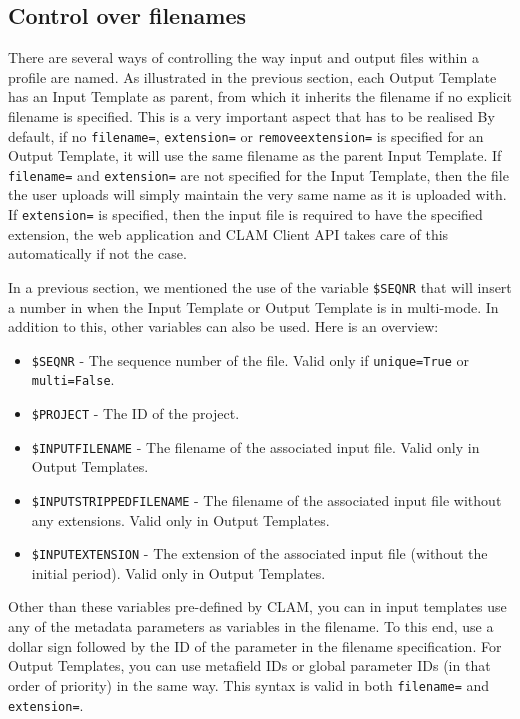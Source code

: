 \documentclass[a4paper,12pt]{report}
\begin{document}
\subsection{Control over filenames}
\label{sec:filenamevariables}

There are several ways of controlling the way input and output files within a
profile are named. As illustrated in the previous section, each Output Template
has an Input Template as parent, from which it inherits the filename if no
explicit filename is specified. This is a very important aspect that has to be
realised By default, if no \texttt{filename=}, \texttt{extension=} or
\texttt{removeextension=} is specified for an Output Template, it will use the
same filename as the parent Input Template. If \texttt{filename=} and
\texttt{extension=} are not specified for the Input Template, then the file the
user uploads will simply maintain the very same name as it is uploaded with. If
\texttt{extension=} is specified, then the input file is required to have the
specified extension, the web application and CLAM Client API takes care of this
automatically if not the case.

In a previous section, we mentioned the use of the variable \texttt{\$SEQNR}
that will insert a number in when the Input Template or Output Template is in
multi-mode. In addition to this, other variables can also be used. Here is an
overview:

\begin{itemize}
\item \texttt{\$SEQNR} - The sequence number of the file. Valid only if \texttt{unique=True} or \texttt{multi=False}.
\item \texttt{\$PROJECT} - The ID of the project.
\item \texttt{\$INPUTFILENAME} - The filename of the associated input file. Valid only in Output Templates.
\item \texttt{\$INPUTSTRIPPEDFILENAME} - The filename of the associated input file without any extensions. Valid only in Output Templates.
\item \texttt{\$INPUTEXTENSION} - The extension of the associated input file (without the initial period). Valid only in Output Templates.
\end{itemize} 

Other than these variables pre-defined by CLAM, you can in input templates use
any of the metadata parameters as variables in the filename. To this end, use a
dollar sign followed by the ID of the parameter in the filename specification.
For Output Templates, you can use metafield IDs or global parameter IDs (in
that order of priority) in the same way. This syntax is valid in both
\texttt{filename=} and \texttt{extension=}.
\end{document}
